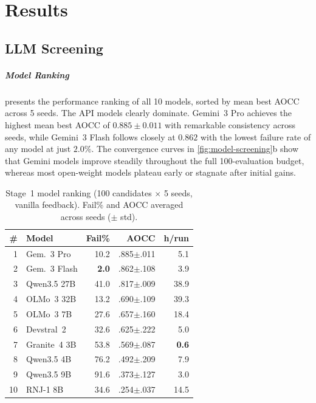 
\chapter{Results}
\label{ch:results}

\section{LLM Screening}
\label{sec:results-screening}

\paragraph{Model Ranking}
\label{sec:results-model-ranking}

 presents the performance ranking of all 10 models, sorted by mean best AOCC across 5 seeds. The API models clearly dominate. Gemini~3 Pro achieves the highest mean best AOCC of $0.885 \pm 0.011$ with remarkable consistency across seeds, while Gemini~3 Flash follows closely at $0.862$ with the lowest failure rate of any model at just $2.0\%$. The convergence curves in \cref{fig:model-screening}b show that Gemini models improve steadily throughout the full 100-evaluation budget, whereas most open-weight models plateau early or stagnate after initial gains.

\begin{table}[t]
\centering
\caption{Stage~1 model ranking (100 candidates $\times$ 5 seeds, vanilla feedback). Fail\% and AOCC averaged across seeds ($\pm$ std).}
\label{tab:model-ranking}
\footnotesize
\begin{tabular}{@{}rlrrr@{}}
\toprule
\textbf{\#} & \textbf{Model} & \textbf{Fail\%} & \textbf{AOCC} & \textbf{h/run} \\
\midrule
1  & Gem.~3 Pro    & 10.2  & .885$\pm$.011 & 5.1 \\
2  & Gem.~3 Flash  & \textbf{2.0} & .862$\pm$.108 & 3.9 \\
3  & Qwen3.5 27B   & 41.0  & .817$\pm$.009 & 38.9 \\
4  & OLMo~3 32B    & 13.2  & .690$\pm$.109 & 39.3 \\
5  & OLMo~3 7B     & 27.6  & .657$\pm$.160 & 18.4 \\
6  & Devstral~2    & 32.6  & .625$\pm$.222 & 5.0 \\
7  & Granite~4 3B  & 53.8  & .569$\pm$.087 & \textbf{0.6} \\
8  & Qwen3.5 4B    & 76.2  & .492$\pm$.209 & 7.9 \\
9  & Qwen3.5 9B    & 91.6  & .373$\pm$.127 & 3.0 \\
10 & RNJ-1 8B      & 34.6  & .254$\pm$.037 & 14.5 \\
\bottomrule
\end{tabular}
\end{table}

